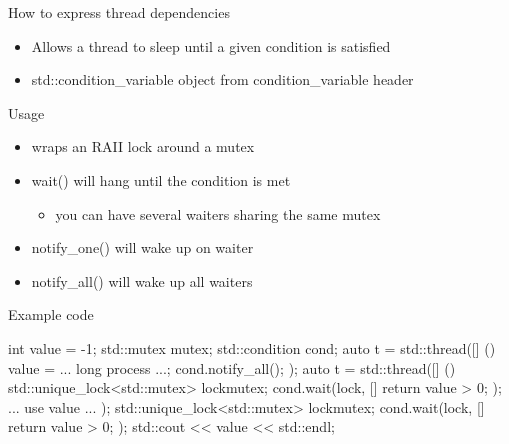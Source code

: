 \begin{frame}[fragile]
  \begin{block}{How to express thread dependencies}
    \begin{itemize}
    \item Allows a thread to sleep until a given condition is satisfied
    \item std::condition\_variable object from condition\_variable header
    \end{itemize}
  \end{block}
  \pause
  \begin{block}{Usage}
    \begin{itemize}
    \item wraps an RAII lock around a mutex
    \item wait() will hang until the condition is met
      \begin{itemize}
      \item you can have several waiters sharing the same mutex
      \end{itemize}
    \item notify\_one() will wake up on waiter
    \item notify\_all() will wake up all waiters
    \end{itemize}
  \end{block}
\end{frame}

\begin{frame}[fragile]
  \begin{exampleblock}{Example code}
    \begin{cppcode*}{}
      int value = -1;
      std::mutex mutex;
      std::condition cond;
      auto t = std::thread([] () {
        value = ... long process ...;
        cond.notify_all();
      });
      auto t = std::thread([] () {
        std::unique_lock<std::mutex> lock{mutex};
        cond.wait(lock, [] { return value > 0; });
        ... use value ...
      });
      { std::unique_lock<std::mutex> lock{mutex};
        cond.wait(lock, [] { return value > 0; });
        std::cout << value << std::endl; }
    \end{cppcode*}
  \end{exampleblock}
\end{frame}


